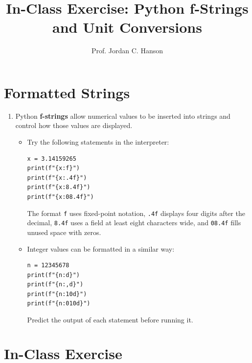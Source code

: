\documentclass{article}
\begin{document}
\twocolumn

\title{In-Class Exercise: Python f-Strings and Unit Conversions}
\author{Prof. Jordan C. Hanson}
\date{}

\maketitle

\section{Formatted Strings}

\begin{enumerate}

\item Python \textbf{f-strings} allow numerical values to be inserted
into strings and control how those values are displayed.

\begin{itemize}

\item Try the following statements in the interpreter:

\begin{verbatim}
x = 3.14159265
print(f"{x:f}")
print(f"{x:.4f}")
print(f"{x:8.4f}")
print(f"{x:08.4f}")
\end{verbatim}

The format \texttt{f} uses fixed-point notation,
\texttt{.4f} displays four digits after the decimal,
\texttt{8.4f} uses a field at least eight characters
wide, and \texttt{08.4f} fills unused space with zeros.

\item Integer values can be formatted in a similar way:

\begin{verbatim}
n = 12345678
print(f"{n:d}")
print(f"{n:,d}")
print(f"{n:10d}")
print(f"{n:010d}")
\end{verbatim}

Predict the output of each statement before running it.

\end{itemize}
\end{enumerate}

\section{In-Class Exercise}
\end{document}
